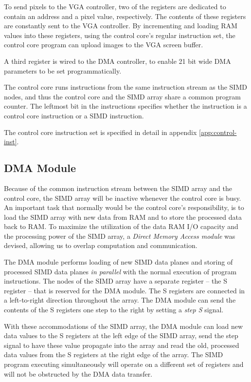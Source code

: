 
To send pixels to the \ac{VGA} controller, two of the registers are dedicated to
contain an address and a pixel value, respectively. The contents of these
registers are constantly sent to the \ac{VGA} controller. By incrementing and
loading \ac{RAM} values into these registers, using the control core's regular
instruction set, the control core program can upload images to the \ac{VGA}
screen buffer.

A third register is wired to the \ac{DMA} controller, to enable 21 bit wide
\ac{DMA} parameters to be set programmatically.

The control core runs instructions from the same instruction stream as the
\ac{SIMD} nodes, and thus the control core and the \ac{SIMD} array share a
common program counter. The leftmost bit in the instructions specifies whether
the instruction is a control core instruction or a \ac{SIMD} instruction.

The control core instruction set is specified in detail in appendix
\ref{app:control-inst}.

\subsection{DMA Module}

Because of the common instruction stream between the \ac{SIMD} array and the
control core, the \ac{SIMD} array will be inactive whenever the control core is
busy. An important task that normally would be the control core's
responsibility, is to load the \ac{SIMD} array with new data from \ac{RAM} and
to store the processed data back to \ac{RAM}. To maximize the utilization of the
data \ac{RAM} \ac{I/O} capacity and the processing power of the \ac{SIMD} array,
a \emph{Direct Memory Access module} was devised, allowing us to overlap computation
and communication.

The \ac{DMA} module performs loading of new \ac{SIMD} data planes and storing of
processed \ac{SIMD} data planes \emph{in parallel} with the normal execution
of program instructions. The nodes of the \ac{SIMD} array have a separate
register -- the S register -- that is reserved for the \ac{DMA} module. The S
registers are connected in a left-to-right direction throughout the
array. The \ac{DMA} module can send the contents of the S registers one step
to the right by setting a \emph{step S} signal.

With these accommodations of the \ac{SIMD} array, the \ac{DMA} module can load
new data values to the S registers at the left edge of the \ac{SIMD} array, send
the step signal to have these value propagate into the array and read the old,
processed data values from the S registers at the right edge of the array. The
\ac{SIMD} program executing simultaneously will operate on a different set of
registers and will not be obstructed by the \ac{DMA} data transfer.


